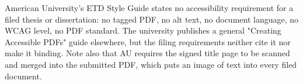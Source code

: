 %
%
	{American University's ETD Style Guide states no accessibility requirement
	 for a filed thesis or dissertation: no tagged PDF, no alt text, no
	 document language, no WCAG level, no PDF standard. The university
	 publishes a general "Creating Accessible PDFs" guide elsewhere, but the
	 filing requirements neither cite it nor make it binding. Note also that AU
	 requires the signed title page to be scanned and merged into the submitted
	 PDF, which puts an image of text into every filed document.}

